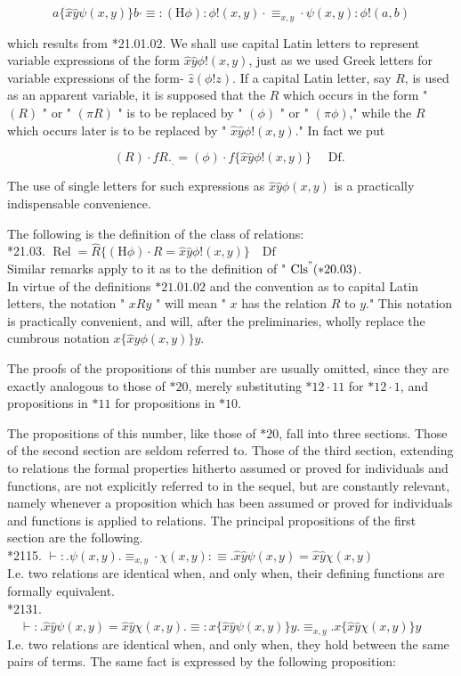 \documentclass[10pt]{article}
\begin{document}
$$
a\{\hat{x} \hat{y} \psi(x, y)\} b \cdot \equiv:(\mathrm{H} \phi): \phi!(x, y) \cdot \equiv_{x, y} \cdot \psi(x, y): \phi!(a, b)
$$

which results from *21.01.02. We shall use capital Latin letters to represent variable expressions of the form $\hat{x} \hat{y} \phi!(x, y)$, just as we used Greek letters for variable expressions of the form- $\hat{z}(\phi!z)$. If a capital Latin letter, say $R$, is used as an apparent variable, it is supposed that the $R$ which occurs in the form " $(R)$ " or " $(\pi R)$ " is to be replaced by " $(\phi)$ " or " $(\pi \phi)$," while the $R$ which occurs later is to be replaced by " $\hat{x} \hat{y} \phi!(x, y)$." In fact we put

$$
(R) \cdot f R ._{.}=(\phi) \cdot f\{\hat{x} \hat{y} \phi!(x, y)\} \quad \text { Df. }
$$

The use of single letters for such expressions as $\hat{x} \hat{y} \phi(x, y)$ is a practically indispensable convenience.

The following is the definition of the class of relations:\\
*21.03. $\operatorname{Rel}=\widehat{R}\{(\mathrm{H} \phi) \cdot R=\hat{x} \hat{y} \phi!(x, y)\} \quad \mathrm{Df}$\\
Similar remarks apply to it as to the definition of " $\mathrm{Cls}^{"}(* 20.03)$.\\
In virtue of the definitions $* 21.01 .02$ and the convention as to capital Latin letters, the notation " $x R y$ " will mean " $x$ has the relation $R$ to $y$." This notation is practically convenient, and will, after the preliminaries, wholly replace the cumbrous notation $x\{\hat{x} \hat{y} \phi(x, y)\} y$.

The proofs of the propositions of this number are usually omitted, since they are exactly analogous to those of $* 20$, merely substituting $* 12 \cdot 11$ for $* 12 \cdot 1$, and propositions in $* 11$ for propositions in $* 10$.

The propositions of this number, like those of $* 20$, fall into three sections. Those of the second section are seldom referred to. Those of the third section, extending to relations the formal properties hitherto assumed or proved for individuals and functions, are not explicitly referred to in the sequel, but are constantly relevant, namely whenever a proposition which has been assumed or proved for individuals and functions is applied to relations. The principal propositions of the first section are the following.\\
*2115. $\vdash: . \psi(x, y) . \equiv_{x, y} \cdot \chi(x, y): \equiv . \hat{x} \hat{y} \psi(x, y)=\hat{x} \hat{y} \chi(x, y)$\\
I.e. two relations are identical when, and only when, their defining functions are formally equivalent.\\
*2131. $\quad \vdash: . \hat{x} \hat{y} \psi(x, y)=\hat{x} \hat{y} \chi(x, y) . \equiv: x\{\hat{x} \hat{y} \psi(x, y)\} y . \equiv_{x, y} . x\{\hat{x} \hat{y} \chi(x, y)\} y$\\
I.e. two relations are identical when, and only when, they hold between the same pairs of terms. The same fact is expressed by the following proposition:
\end{document}
